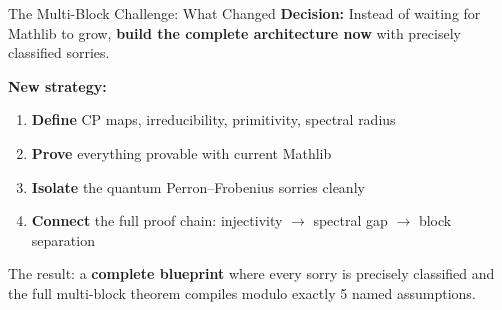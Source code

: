 \documentclass[aspectratio=169,10pt]{beamer}
\begin{document}
\begin{frame}{The Multi-Block Challenge: What Changed}
\vspace{-0.4em}
\textbf{Decision:} Instead of waiting for Mathlib to grow, \textbf{build the complete architecture now} with precisely classified sorries.

\vspace{0.3em}
\begin{center}
\end{center}

\vspace{0.2em}
\textbf{New strategy:}
\begin{enumerate}\itemsep0.1em
  \item {\small \textbf{Define} CP maps, irreducibility, primitivity, spectral radius}
  \item {\small \textbf{Prove} everything provable with current Mathlib}
  \item {\small \textbf{Isolate} the quantum Perron--Frobenius sorries cleanly}
  \item {\small \textbf{Connect} the full proof chain: injectivity $\to$ spectral gap $\to$ block separation}
\end{enumerate}

\vspace{0.2em}
{\small The result: a \textbf{complete blueprint} where every sorry is precisely classified and the full multi-block theorem compiles modulo exactly 5 named assumptions.}
\end{frame}
\end{document}
